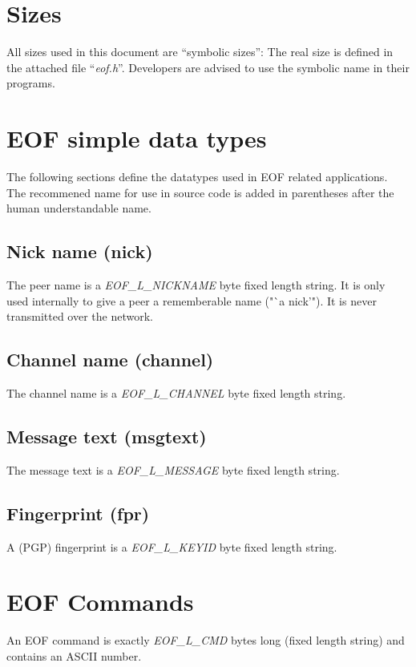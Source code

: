 \documentclass[12pt,a4paper]{book}
\begin{document}
\section{Sizes}
%
All sizes used in this document are "`symbolic sizes"': The real size
is defined in the attached file "`\emph{eof.h}"'.
Developers are advised to use the symbolic name in their programs.
\section{EOF simple data types}
The following sections define the datatypes used in EOF related
applications. The recommened name for use in source
code is added in parentheses after the human understandable name.
\subsection{Nick name (nick)}
The peer name is a \emph{EOF\_L\_NICKNAME} byte fixed length string.
It is only used internally to give a peer a rememberable name ("`a nick'").
It is never transmitted over the network.
\subsection{Channel name (channel)}
The channel name is a \emph{EOF\_L\_CHANNEL} byte fixed length string.
\subsection{Message text (msgtext)}
The message text is a \emph{EOF\_L\_MESSAGE} byte fixed length string.
\subsection{Fingerprint (fpr)}
A (PGP) fingerprint is a \emph{EOF\_L\_KEYID} byte fixed length string.
\section{EOF Commands}
An EOF command is exactly \emph{EOF\_L\_CMD} bytes long (fixed length string)
and contains an ASCII number.
\end{document}
